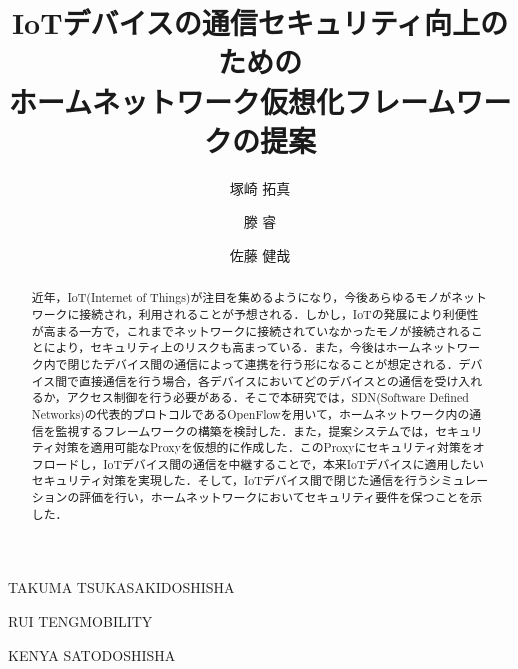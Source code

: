 \documentclass[Japanese]{dicomopapers}
\begin{document}
\title{IoTデバイスの通信セキュリティ向上のための\\ホームネットワーク仮想化フレームワークの提案}


\author{塚崎 拓真}{TAKUMA TSUKASAKI}{DOSHISHA}
\author{滕 睿}{RUI TENG}{MOBILITY}
\author{佐藤 健哉}{KENYA SATO}{DOSHISHA}

\begin{abstract}
	近年，IoT(Internet of Things)が注目を集めるようになり，今後あらゆるモノがネットワークに接続され，利用されることが予想される．しかし，IoTの発展により利便性が高まる一方で，これまでネットワークに接続されていなかったモノが接続されることにより，セキュリティ上のリスクも高まっている．また，今後はホームネットワーク内で閉じたデバイス間の通信によって連携を行う形になることが想定される．デバイス間で直接通信を行う場合，各デバイスにおいてどのデバイスとの通信を受け入れるか，アクセス制御を行う必要がある．そこで本研究では，SDN(Software Defined Networks)の代表的プロトコルであるOpenFlowを用いて，ホームネットワーク内の通信を監視するフレームワークの構築を検討した．また，提案システムでは，セキュリティ対策を適用可能なProxyを仮想的に作成した．このProxyにセキュリティ対策をオフロードし，IoTデバイス間の通信を中継することで，本来IoTデバイスに適用したいセキュリティ対策を実現した．そして，IoTデバイス間で閉じた通信を行うシミュレーションの評価を行い，ホームネットワークにおいてセキュリティ要件を保つことを示した．

\end{abstract}

\maketitle

\end{document}
